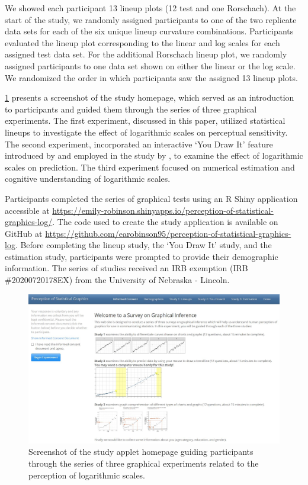 \documentclass[12pt]{article}
\begin{document}
We showed each participant 13 lineup plots (12 test and one Rorschach).
At the start of the study, we randomly assigned participants to one of
the two replicate data sets for each of the six unique lineup curvature
combinations. Participants evaluated the lineup plot corresponding to
the linear and log scales for each assigned test data set. For the
additional Rorschach lineup plot, we randomly assigned participants to
one data set shown on either the linear or the log scale. We randomized
the order in which participants saw the assigned 13 lineup plots.

\cref{fig:study-homepage} presents a screenshot of the study homepage,
which served as an introduction to participants and guided them through
the series of three graphical experiments. The first experiment,
discussed in this paper, utilized statistical lineups to investigate the
effect of logarithmic scales on perceptual sensitivity. The second
experiment, incorporated an interactive `You Draw It' feature introduced
by \citet{aisch2015you} and employed in the study by
\citet{robinson2022eye}, to examine the effect of logarithmic scales on
prediction. The third experiment focused on numerical estimation and
cognitive understanding of logarithmic scales.

Participants completed the series of graphical tests using an R Shiny
application \citep{shiny_pkg} accessible at
\url{https://emily-robinson.shinyapps.io/perception-of-statistical-graphics-log/}.
The code used to create the study application is available on GitHub at
\url{https://github.com/earobinson95/perception-of-statistical-graphics-log}.
Before completing the lineup study, the `You Draw It' study, and the
estimation study, participants were prompted to provide their
demographic information. The series of studies received an IRB exemption
(IRB \#20200720178EX) from the University of Nebraska - Lincoln.

\begin{figure}[tbp]

{\centering \includegraphics[width=1\linewidth,]{images/study-homepage} 

}

\caption{Screenshot of the study applet homepage guiding participants through the series of three graphical experiments related to the perception of logarithmic scales.}\label{fig:study-homepage}
\end{figure}
\end{document}
